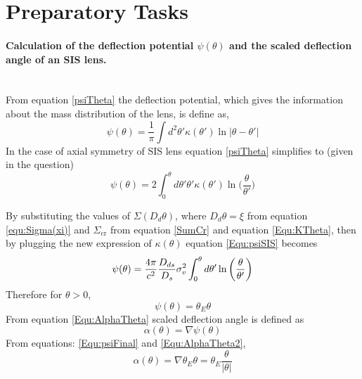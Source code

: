 \clearpage
\section{Preparatory Tasks}
\paragraph{Calculation of the deflection potential $\psi(\theta) $ and the scaled deflection angle of an SIS lens.}\hspace{0pt}\\
 From equation \ref{psiTheta} the deflection potential, which gives the information about the mass distribution of the lens, is define as,
 \begin{equation}
 \psi(\theta)=\frac{1}{\pi}\int d^2\theta'\kappa(\theta')\ln |\theta-\theta'| 
 \end{equation}
 In the case of axial symmetry of SIS lens equation \ref{psiTheta} simplifies to (given in the question)
 \begin{equation}
 \psi(\theta)=2\int_{0}^{\theta}d\theta' \theta'\kappa(\theta') \ln \bigg(\frac{\theta}{\theta'}\bigg)
 \label{Equ:psiSIS}
 \end{equation}

 By substituting the values of $ \Sigma(D_{d}\theta) $, where $ D_{d}\theta=\xi $ from equation \ref{equ:Sigma(xi)} and  $ \Sigma_\text{cr} $ from equation \ref{SumCr} and equation \ref{Equ:KTheta}, then by plugging the new expression of  $ \kappa(\theta) $ equation \ref{Equ:psiSIS} becomes
 \begin{equation*}
	 \psi(\theta) =\frac{4\pi}{c^2}\frac{D_{ds}}{D_{s}}\sigma^2_{v}\int_{0}^{\theta}d\theta' \ln \bigg(\frac{\theta}{\theta'}\bigg) \\
 \end{equation*}
 Therefore for $\theta > 0$, 
 \begin{equation}
 \psi(\theta)=\theta_{E}\theta 
 \label{Equ:psiFinal}
 \end{equation}
 From equation \ref{Equ:AlphaTheta} scaled deflection angle is defined as
 \begin{equation*}
 \alpha(\theta)=\nabla\psi(\theta)
 \label{Equ:AlphaTheta2}
 \end{equation*}
 From equations: \ref{Equ:psiFinal} and \ref{Equ:AlphaTheta2},
 \begin{equation}
 \alpha(\theta)=\nabla \theta_{E}\theta = \theta_{E} \frac{\theta}{|\theta|}
 \label{Equ:AlphaThetaFinal}
 \end{equation}
 
